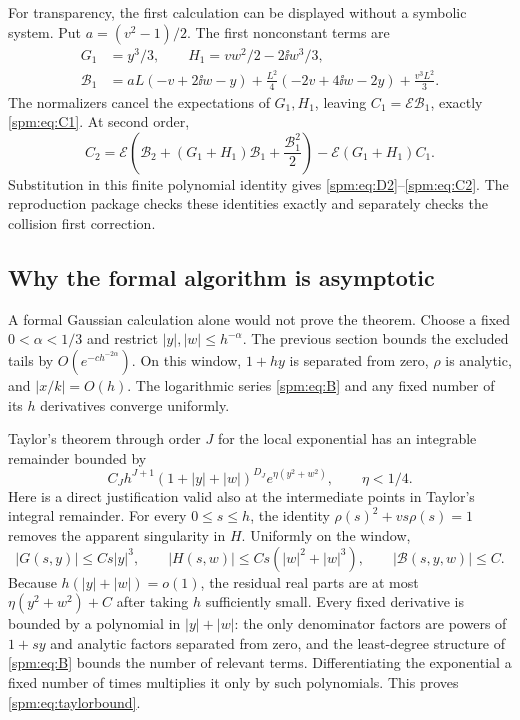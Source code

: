 For transparency, the first calculation can be displayed without a symbolic system. Put $a=(v^2-1)/2$. The first nonconstant terms are
\begin{align*}
 G_1&=y^3/3,\qquad H_1=vw^2/2-2\ii w^3/3,\\
 \mathcal B_1&=aL(-v+2\ii w-y)
       +\frac{L^2}{4}(-2v+4\ii w-2y)+\frac{v^3L^2}{3}.
\end{align*}
The normalizers cancel the expectations of $G_1,H_1$, leaving
$C_1=\mathcal E\mathcal B_1$, exactly \eqref{spm:eq:C1}. At second order,
\begin{equation}\label{spm:eq:secondalgorithm}
 C_2=\mathcal E\left(\mathcal B_2+(G_1+H_1)\mathcal B_1
                         +\frac{\mathcal B_1^2}{2}\right)
       -\mathcal E(G_1+H_1)C_1.
\end{equation}
Substitution in this finite polynomial identity gives \eqref{spm:eq:D2}--\eqref{spm:eq:C2}. The reproduction package checks these identities exactly and separately checks the collision first correction.

\subsection{Why the formal algorithm is asymptotic}
A formal Gaussian calculation alone would not prove the theorem. Choose a fixed $0<\alpha<1/3$ and restrict $|y|,|w|\leq h^{-\alpha}$. The previous section bounds the excluded tails by $O(e^{-c h^{-2\alpha}})$. On this window, $1+hy$ is separated from zero, $\rho$ is analytic, and $|x/k|=O(h)$. The logarithmic series \eqref{spm:eq:B} and any fixed number of its $h$ derivatives converge uniformly.

Taylor's theorem through order $J$ for the local exponential has an integrable remainder bounded by
\begin{equation}\label{spm:eq:taylorbound}
 C_Jh^{J+1}(1+|y|+|w|)^{D_J}e^{\eta(y^2+w^2)},
 \qquad \eta<1/4.
\end{equation}
Here is a direct justification valid also at the intermediate points in Taylor's integral remainder. For every $0\leq s\leq h$, the identity
$\rho(s)^2+vs\rho(s)=1$ removes the apparent singularity in $H$. Uniformly on the window,
\[
 |G(s,y)|\leq Cs|y|^3,\qquad
 |H(s,w)|\leq Cs(|w|^2+|w|^3),\qquad
 |\mathcal B(s,y,w)|\leq C.
\]
Because $h(|y|+|w|)=o(1)$, the residual real parts are at most
$\eta(y^2+w^2)+C$ after taking $h$ sufficiently small. Every fixed derivative is bounded by a polynomial in $|y|+|w|$: the only denominator factors are powers of $1+sy$ and analytic factors separated from zero, and the least-degree structure of \eqref{spm:eq:B} bounds the number of relevant terms. Differentiating the exponential a fixed number of times multiplies it only by such polynomials. This proves \eqref{spm:eq:taylorbound}.

